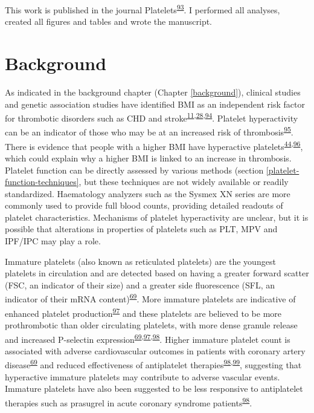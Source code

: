 \documentclass[11pt,twoside]{bristolthesis}
\begin{document}
This work is published in the journal Platelets\textsuperscript{\protect\hyperlink{ref-Goudswaard2022}{93}}. I performed all analyses, created all figures and tables and wrote the manuscript.

\hypertarget{background-1}{%
\section{Background}\label{background-1}}

As indicated in the background chapter (Chapter \ref{background}), clinical studies and genetic association studies have identified BMI as an independent risk factor for thrombotic disorders such as CHD and stroke\textsuperscript{\protect\hyperlink{ref-Nordestgaard2012}{11},\protect\hyperlink{ref-Dale2017}{28},\protect\hyperlink{ref-Wolk2003a}{94}}. Platelet hyperactivity can be an indicator of those who may be at an increased risk of thrombosis\textsuperscript{\protect\hyperlink{ref-Puurunen2018}{95}}. There is evidence that people with a higher BMI have hyperactive platelets\textsuperscript{\protect\hyperlink{ref-Nardin2015}{44},\protect\hyperlink{ref-Barrachina2019}{96}}, which could explain why a higher BMI is linked to an increase in thrombosis. Platelet function can be directly assessed by various methods (section \ref{platelet-function-techniques}, but these techniques are not widely available or readily standardized. Haematology analyzers such as the Sysmex XN series are more commonly used to provide full blood counts, providing detailed readouts of platelet characteristics. Mechanisms of platelet hyperactivity are unclear, but it is possible that alterations in properties of platelets such as PLT, MPV and IPF/IPC may play a role.

Immature platelets (also known as reticulated platelets) are the youngest platelets in circulation and are detected based on having a greater forward scatter (FSC, an indicator of their size) and a greater side fluorescence (SFL, an indicator of their mRNA content)\textsuperscript{\protect\hyperlink{ref-Ibrahim2014}{69}}. More immature platelets are indicative of enhanced platelet production\textsuperscript{\protect\hyperlink{ref-Lev2016a}{97}} and these platelets are believed to be more prothrombotic than older circulating platelets, with more dense granule release and increased P-selectin expression\textsuperscript{\protect\hyperlink{ref-Ibrahim2014}{69},\protect\hyperlink{ref-Lev2016a}{97},\protect\hyperlink{ref-Bernlochner2015a}{98}}. Higher immature platelet count is associated with adverse cardiovascular outcomes in patients with coronary artery disease\textsuperscript{\protect\hyperlink{ref-Ibrahim2014}{69}} and reduced effectiveness of antiplatelet therapies\textsuperscript{\protect\hyperlink{ref-Bernlochner2015a}{98},\protect\hyperlink{ref-Ibrahim2012}{99}}, suggesting that hyperactive immature platelets may contribute to adverse vascular events. Immature platelets have also been suggested to be less responsive to antiplatelet therapies such as prasugrel in acute coronary syndrome patients\textsuperscript{\protect\hyperlink{ref-Bernlochner2015a}{98}}.
\end{document}
